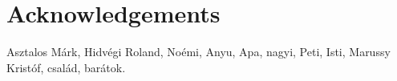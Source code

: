 \chapter*{Acknowledgements}
{}
\thispagestyle{plain}

Asztalos Márk, Hidvégi Roland, Noémi, Anyu, Apa, nagyi, Peti, Isti, Marussy Kristóf, család, barátok.

